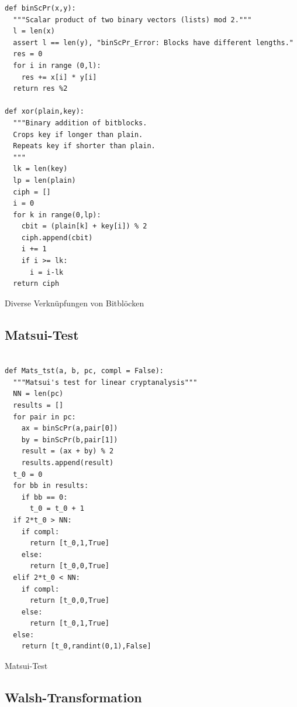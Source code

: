 \begin{refsegment}
\begin{sagecode}
\begin{verbatim}
def binScPr(x,y):
  """Scalar product of two binary vectors (lists) mod 2."""
  l = len(x)
  assert l == len(y), "binScPr_Error: Blocks have different lengths."
  res = 0
  for i in range (0,l):
    res += x[i] * y[i]
  return res %2

def xor(plain,key):
  """Binary addition of bitblocks.
  Crops key if longer than plain.
  Repeats key if shorter than plain.
  """
  lk = len(key)
  lp = len(plain)
  ciph = []
  i = 0
  for k in range(0,lp):
    cbit = (plain[k] + key[i]) % 2
    ciph.append(cbit)
    i += 1
    if i >= lk:
      i = i-lk
  return ciph
\end{verbatim}
\caption{Diverse Verknüpfungen von
   Bitblöcken
   }\label{Sage-code-bool-div-bbl}
\end{sagecode}
\clearpage

\subsection{Matsui-Test}\label{ss-bool-mtst}

\begin{sagecode}
\begin{verbatim}

def Mats_tst(a, b, pc, compl = False):
  """Matsui's test for linear cryptanalysis"""
  NN = len(pc)
  results = []
  for pair in pc:
    ax = binScPr(a,pair[0])
    by = binScPr(b,pair[1])
    result = (ax + by) % 2
    results.append(result)
  t_0 = 0
  for bb in results:
    if bb == 0:
      t_0 = t_0 + 1
  if 2*t_0 > NN:
    if compl:
      return [t_0,1,True]
    else:
      return [t_0,0,True]
  elif 2*t_0 < NN:
    if compl:
      return [t_0,0,True]
    else:
      return [t_0,1,True]
  else:
    return [t_0,randint(0,1),False]
\end{verbatim}
\caption{Matsui-Test}\label{Sage-code-bool-mtst}
\end{sagecode}
\clearpage

\subsection{Walsh-Transformation}\label{ss-bool-walsh}

\begin{sagecode}
\begin{verbatim}


\end{verbatim}
\end{sagecode}
\end{refsegment}
